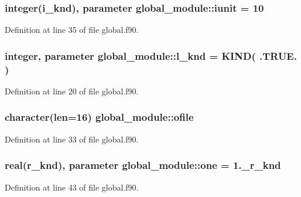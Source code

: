 \hypertarget{classglobal__module_a734e710669b353233ba6b431d2b10a60}{
\subsubsection[{iunit}]{\setlength{\rightskip}{0pt plus 5cm}integer({\bf i\-\_\-knd}), parameter global\-\_\-module\-::iunit = 10}}\label{classglobal__module_a734e710669b353233ba6b431d2b10a60}


Definition at line 35 of file global.\-f90.

\hypertarget{classglobal__module_a968ba1aa6e3f1767b59bfb8bd310405e}{
\subsubsection[{l\-\_\-knd}]{\setlength{\rightskip}{0pt plus 5cm}integer, parameter global\-\_\-module\-::l\-\_\-knd = K\-I\-N\-D( .T\-R\-U\-E. )}}\label{classglobal__module_a968ba1aa6e3f1767b59bfb8bd310405e}


Definition at line 20 of file global.\-f90.

\hypertarget{classglobal__module_aa25a5f9ded0bd9460cc9a5c842a6812b}{
\subsubsection[{ofile}]{\setlength{\rightskip}{0pt plus 5cm}character(len=16) global\-\_\-module\-::ofile}}\label{classglobal__module_aa25a5f9ded0bd9460cc9a5c842a6812b}


Definition at line 33 of file global.\-f90.

\hypertarget{classglobal__module_ad2273c99f1e5fd95558f9217ed48f65f}{
\subsubsection[{one}]{\setlength{\rightskip}{0pt plus 5cm}real({\bf r\-\_\-knd}), parameter global\-\_\-module\-::one = 1.\-\_\-r\-\_\-knd}}\label{classglobal__module_ad2273c99f1e5fd95558f9217ed48f65f}


Definition at line 43 of file global.\-f90.

